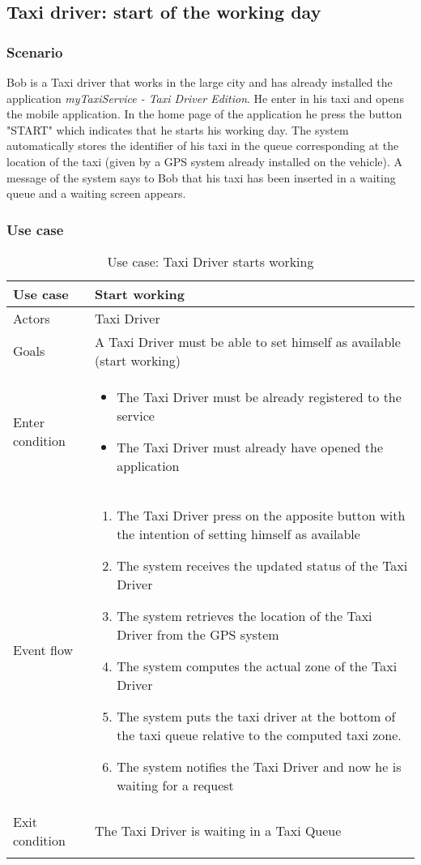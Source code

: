 \subsection{Taxi driver: start of the working day}
\subsubsection{Scenario}
Bob is a Taxi driver that works in the large city and has already installed the application \textit{myTaxiService - Taxi Driver Edition}.
He enter in his taxi and opens the mobile application. In the home page of the application he press the button "START" which indicates that he starts his working day. The system automatically stores the identifier of his taxi in the queue corresponding at the location of the taxi (given by a GPS system already installed on the vehicle).
A message of the system says to Bob that his taxi has been inserted in a waiting queue and a waiting screen appears.

\subsubsection{Use case}
\begin{center}
\begin{longtable}{| p{} | p{} |} \hline
	Use case & \textbf{Start working} \\ \hline 
	Actors & Taxi Driver \\ \hline
	Goals & A Taxi Driver must be able to set himself as available (start working)  \\ \hline
	Enter condition & \begin{itemize}
						\item The Taxi Driver must be already registered to the service
						\item The Taxi Driver must already have opened the application
						\end{itemize} \\ \hline
	Event flow & \begin{enumerate}
					\item The Taxi Driver press on the apposite button with the intention of setting himself as available
					\item The system receives the updated status of the Taxi Driver
					\item The system retrieves the location of the Taxi Driver from the GPS system
					\item The system computes the actual zone of the Taxi Driver
					\item The system puts the taxi driver at the bottom of the taxi queue relative to the computed taxi zone.
					\item The system notifies the Taxi Driver and now he is waiting for a request
				\end{enumerate} \\ \hline
	Exit condition & The Taxi Driver is waiting in a Taxi Queue\\ \hline
	\caption{Use case: Taxi Driver starts working}
\end{longtable}
\end{center}
